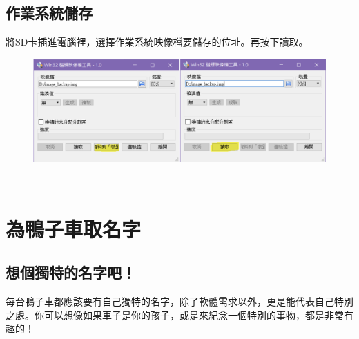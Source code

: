 \documentclass{article}
\begin{document}
\subsection{作業系統儲存}
將SD卡插進電腦裡，選擇作業系統映像檔要儲存的位址。再按下讀取。
\\
\begin{figure}[htp]
    \begin{center}
        \includegraphics[width=400pt]{pic/1_2.png}
    \end{center}
\end{figure}
\\

\newpage
\section{為鴨子車取名字}
\subsection{想個獨特的名字吧！}
每台鴨子車都應該要有自己獨特的名字，除了軟體需求以外，更是能代表自己特別之處。你可以想像如果車子是你的孩子，或是來紀念一個特別的事物，都是非常有趣的！
\end{document}
